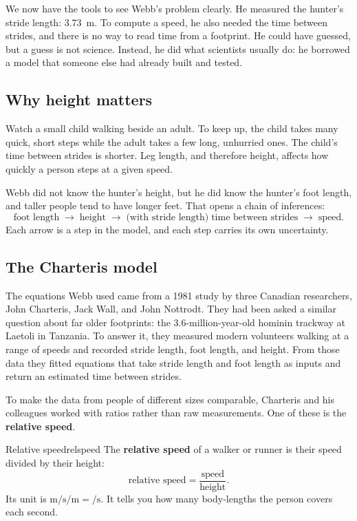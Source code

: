 \documentclass[11pt,twoside,openany]{book}
\begin{document}
We now have the tools to see Webb's problem clearly. He measured the hunter's stride length: \SI{3.73}{\metre}. To compute a speed, he also needed the time between strides, and there is no way to read time from a footprint. He could have guessed, but a guess is not science. Instead, he did what scientists usually do: he borrowed a model that someone else had already built and tested.

\subsection{Why height matters}

Watch a small child walking beside an adult. To keep up, the child takes many quick, short steps while the adult takes a few long, unhurried ones. The child's time between strides is shorter. Leg length, and therefore height, affects how quickly a person steps at a given speed.

Webb did not know the hunter's height, but he did know the hunter's foot length, and taller people tend to have longer feet. That opens a chain of inferences:
\[
\text{foot length} \;\longrightarrow\; \text{height} \;\longrightarrow\; \text{(with stride length)}\;\text{time between strides} \;\longrightarrow\; \text{speed}.
\]
Each arrow is a step in the model, and each step carries its own uncertainty.

\subsection{The Charteris model}

The equations Webb used came from a 1981 study by three Canadian researchers, John Charteris, Jack Wall, and John Nottrodt. They had been asked a similar question about far older footprints: the 3.6-million-year-old hominin trackway at Laetoli in Tanzania. To answer it, they measured modern volunteers walking at a range of speeds and recorded stride length, foot length, and height. From those data they fitted equations that take stride length and foot length as inputs and return an estimated time between strides.

To make the data from people of different sizes comparable, Charteris and his colleagues worked with ratios rather than raw measurements. One of these is the \textbf{relative speed}.

\begin{definition}{Relative speed}{relspeed}
The \textbf{relative speed} of a walker or runner is their speed divided by their height:
\[
\text{relative speed} = \frac{\text{speed}}{\text{height}}.
\]
Its unit is $\si{\metre\per\second}/\si{\metre} = \si{\per\second}$. It tells you how many body-lengths the person covers each second.
\end{definition}
\end{document}
